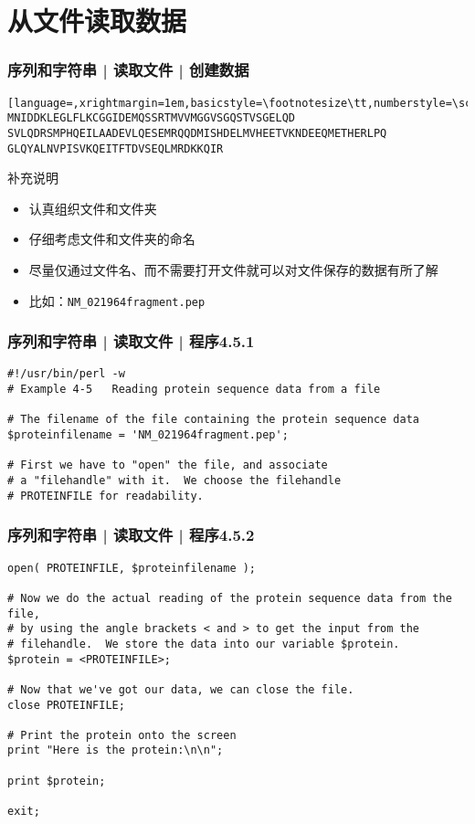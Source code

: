 \section{从文件读取数据}
\begin{frame}[fragile]
  \frametitle{序列和字符串 | 读取文件 | 创建数据}
\begin{lstlisting}[language=,xrightmargin=1em,basicstyle=\footnotesize\tt,numberstyle=\scriptsize]
MNIDDKLEGLFLKCGGIDEMQSSRTMVVMGGVSGQSTVSGELQD
SVLQDRSMPHQEILAADEVLQESEMRQQDMISHDELMVHEETVKNDEEQMETHERLPQ
GLQYALNVPISVKQEITFTDVSEQLMRDKKQIR
\end{lstlisting}
\pause
\begin{block}{补充说明}
  \begin{itemize}
    \item 认真组织文件和文件夹
    \item 仔细考虑文件和文件夹的命名
    \item 尽量仅通过文件名、而不需要打开文件就可以对文件保存的数据有所了解
    \item 比如：\verb|NM_021964fragment.pep|
  \end{itemize}
\end{block}
\end{frame}

\begin{frame}[fragile]
  \frametitle{序列和字符串 | 读取文件 | 程序4.5.1}
\begin{lstlisting}
#!/usr/bin/perl -w
# Example 4-5   Reading protein sequence data from a file

# The filename of the file containing the protein sequence data
$proteinfilename = 'NM_021964fragment.pep';

# First we have to "open" the file, and associate
# a "filehandle" with it.  We choose the filehandle
# PROTEINFILE for readability.
\end{lstlisting}  
\end{frame}

\begin{frame}[fragile]
  \frametitle{序列和字符串 | 读取文件 | 程序4.5.2}
\begin{lstlisting}[firstnumber=10,basicstyle=\footnotesize\tt]
open( PROTEINFILE, $proteinfilename );

# Now we do the actual reading of the protein sequence data from the file,
# by using the angle brackets < and > to get the input from the
# filehandle.  We store the data into our variable $protein.
$protein = <PROTEINFILE>;

# Now that we've got our data, we can close the file.
close PROTEINFILE;

# Print the protein onto the screen
print "Here is the protein:\n\n";

print $protein;

exit;
\end{lstlisting}  
\end{frame}

